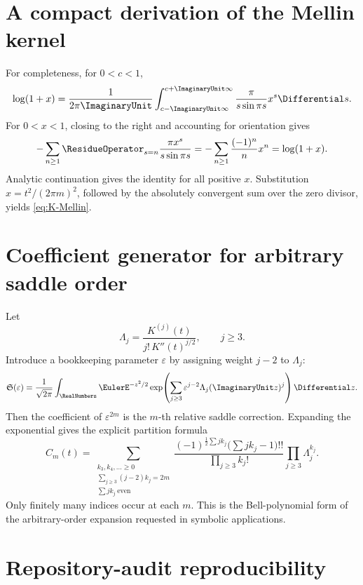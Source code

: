 \documentclass[11pt,oneside]{article}
\theoremstyle{definition}
\theoremstyle{remark}
\begin{document}
\appendix

\section{A compact derivation of the Mellin kernel}

For completeness, for \(0<c<1\),
\[
 \log(1+x)
 =\frac1{2\pi\ImaginaryUnit}
  \int_{c-\ImaginaryUnit\infty}^{c+\ImaginaryUnit\infty}
  \frac{\pi}{s\sin\pi s}x^s\Differential s.
\]
For \(0<x<1\), closing to the right and accounting for orientation gives
\[
 -\sum_{n\geq1}\ResidueOperator_{s=n}
 \frac{\pi x^s}{s\sin\pi s}
 =-\sum_{n\geq1}\frac{(-1)^n}{n}x^n
 =\log(1+x).
\]
Analytic continuation gives the identity for all positive \(x\).
Substitution \(x=t^2/(2\pi m)^2\), followed by the absolutely convergent
sum over the zero divisor, yields \eqref{eq:K-Mellin}.

\section{Coefficient generator for arbitrary saddle order}

Let
\[
 \Lambda_j=\frac{K^{(j)}(t)}{j!\,K''(t)^{j/2}},
 \qquad j\geq3.
\]
Introduce a bookkeeping parameter \(\varepsilon\) by assigning weight
\(j-2\) to \(\Lambda_j\):
\[
 \mathfrak S(\varepsilon)
 =
 \frac1{\sqrt{2\pi}}\int_\RealNumbers\EulerE^{-z^2/2}
 \exp\!\left(
  \sum_{j\geq3}
   \varepsilon^{j-2}\Lambda_j(\ImaginaryUnit z)^j
 \right)\Differential z.
\]
Then the coefficient of \(\varepsilon^{2m}\) is the \(m\)-th relative
saddle correction.  Expanding the exponential gives the explicit partition
formula
\[
 C_m(t)=
 \sum_{\substack{k_3,k_4,\ldots\geq0\\
                 \sum_{j\geq3}(j-2)k_j=2m\\
                 \sum j k_j\ \mathrm{even}}}
 \frac{(-1)^{\frac12\sum j k_j}
       \bigl(\sum j k_j-1\bigr)!!}
      {\prod_{j\geq3}k_j!}
 \prod_{j\geq3}\Lambda_j^{k_j}.
\]
Only finitely many indices occur at each \(m\).  This is the Bell-polynomial
form of the arbitrary-order expansion requested in symbolic applications.

\section{Repository-audit reproducibility}
\end{document}
